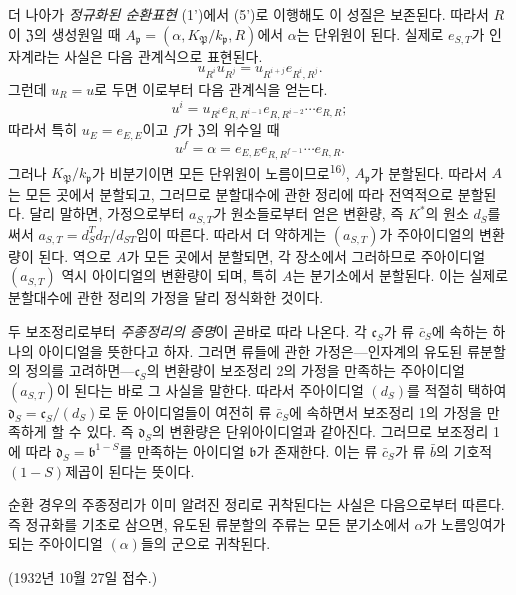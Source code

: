 더 나아가 \emph{정규화된 순환표현} (1')에서 (5')로 이행해도 이 성질은 보존된다. 따라서 \(R\)이 \(\mathfrak Z\)의 생성원일 때 \(A_{\mathfrak p}=(\alpha,K_{\mathfrak P}/k_{\mathfrak p},R)\)에서 \(\alpha\)는 단위원이 된다. 실제로 \(e_{S,T}\)가 인자계라는 사실은 다음 관계식으로 표현된다.
\[
u_{R^i}u_{R^j}=u_{R^{i+j}}e_{R^i,R^j}.
\]
그런데 \(u_R=u\)로 두면 이로부터 다음 관계식을 얻는다.
\[
u^i=u_{R^i}e_{R,R^{i-1}}e_{R,R^{i-2}}\cdots e_{R,R};
\]
따라서 특히 \(u_E=e_{E,E}\)이고 \(f\)가 \(\mathfrak Z\)의 위수일 때
\[
u^f=\alpha=e_{E,E}e_{R,R^{f-1}}\cdots e_{R,R}.
\]
그러나 \(K_{\mathfrak P}/k_{\mathfrak p}\)가 비분기이면 모든 단위원이 노름이므로\textsuperscript{16)}, \(A_{\mathfrak p}\)가 분할된다. 따라서 \(A\)는 모든 곳에서 분할되고, 그러므로 분할대수에 관한 정리에 따라 전역적으로 분할된다. 달리 말하면, 가정으로부터 \(a_{S,T}\)가 원소들로부터 얻은 변환량, 즉 \(K^*\)의 원소 \(d_S\)를 써서 \(a_{S,T}=d_S^Td_T/d_{ST}\)임이 따른다. 따라서 더 약하게는 \((a_{S,T})\)가 주아이디얼의 변환량이 된다. 역으로 \(A\)가 모든 곳에서 분할되면, 각 장소에서 그러하므로 주아이디얼 \((a_{S,T})\) 역시 아이디얼의 변환량이 되며, 특히 \(A\)는 분기소에서 분할된다. 이는 실제로 분할대수에 관한 정리의 가정을 달리 정식화한 것이다.

두 보조정리로부터 \emph{주종정리의 증명}이 곧바로 따라 나온다. 각 \(\mathfrak c_S\)가 류 \(\bar c_S\)에 속하는 하나의 아이디얼을 뜻한다고 하자. 그러면 류들에 관한 가정은---인자계의 유도된 류분할의 정의를 고려하면---\(\mathfrak c_S\)의 변환량이 보조정리 2의 가정을 만족하는 주아이디얼 \((a_{S,T})\)이 된다는 바로 그 사실을 말한다. 따라서 주아이디얼 \((d_S)\)를 적절히 택하여 \(\mathfrak d_S=\mathfrak c_S/(d_S)\)로 둔 아이디얼들이 여전히 류 \(\bar c_S\)에 속하면서 보조정리 1의 가정을 만족하게 할 수 있다. 즉 \(\mathfrak d_S\)의 변환량은 단위아이디얼과 같아진다. 그러므로 보조정리 1에 따라 \(\mathfrak d_S=\mathfrak b^{1-S}\)를 만족하는 아이디얼 \(\mathfrak b\)가 존재한다. 이는 류 \(\bar c_S\)가 류 \(\bar b\)의 기호적 \((1-S)\)제곱이 된다는 뜻이다.

순환 경우의 주종정리가 이미 알려진 정리로 귀착된다는 사실은 다음으로부터 따른다. 즉 정규화를 기초로 삼으면, 유도된 류분할의 주류는 모든 분기소에서 \(\alpha\)가 노름잉여가 되는 주아이디얼 \((\alpha)\)들의 군으로 귀착된다.

\begin{center}
(1932년 10월 27일 접수.)
\end{center}
